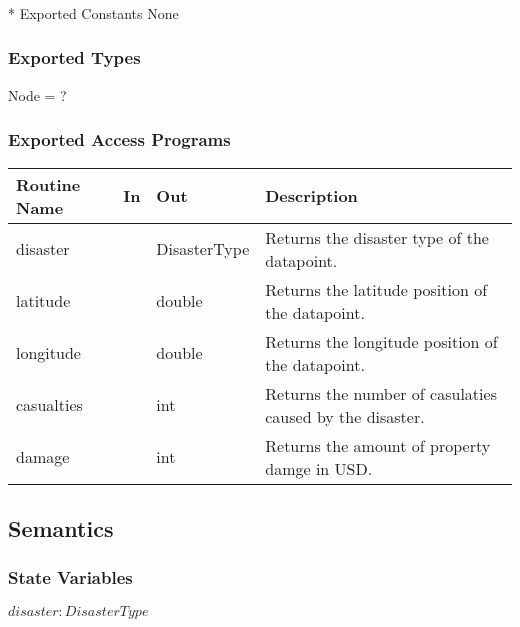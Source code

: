 \documentclass[12pt]{article}
\begin{document}
                \subsubsection{}* {Exported Constants}
                None
                \subsubsection* {Exported Types}
                Node = ?

                
                \subsubsection* {Exported Access Programs}
                

                \begin{tabular}{| l | l | l | p{5cm} |}
                    \hline
                    \textbf{Routine Name} & \textbf{In} & \textbf{Out} & \textbf{Description}\\
                    \hline
                    disaster&&DisasterType& Returns the disaster type of the datapoint.\\
                    \hline
                    latitude&&double& Returns the latitude position of the datapoint.\\
                    \hline
                    longitude&&double& Returns the longitude position of the datapoint.\\
                    \hline
                    casualties&&int& Returns the number of casulaties caused by the disaster.\\
                    \hline
                    damage&&int& Returns the amount of property damge in USD.\\
                    \hline
                    \end{tabular}
                
                \subsection* {Semantics}
                
                \subsubsection* {State Variables}
                
                $disaster: DisasterType$
                
\end{document}
